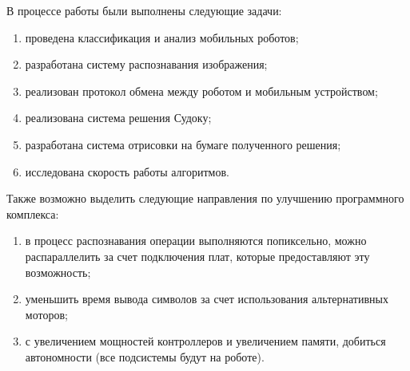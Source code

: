\Conclusion %

В процессе работы были выполнены следующие задачи:

\begin{enumerate}
    \item проведена классификация и анализ мобильных роботов;
	\item разработана систему распознавания изображения;
	\item реализован протокол обмена между роботом и мобильным устройством; 
	\item реализована система решения Судоку;
	\item разработана система отрисовки на бумаге полученного решения;
	\item исследована скорость работы алгоритмов.
\end{enumerate}

Также возможно выделить следующие направления по улучшению программного комплекса:

\begin{enumerate}
    \item в процесс распознавания операции выполняются попиксельно, можно распараллелить за счет подключения плат, которые предоставляют эту возможность;
	\item уменьшить время вывода символов за счет использования альтернативных моторов;
	\item с увеличением мощностей контроллеров и увеличением памяти, добиться автономности (все подсистемы будут на роботе).
\end{enumerate}


